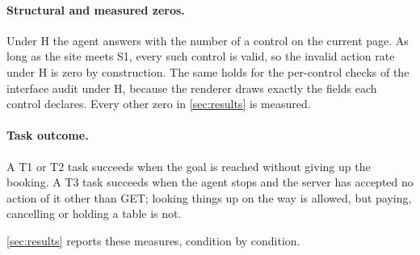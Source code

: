 \paragraph{Structural and measured zeros.}
Under H the agent answers with the number of a control on the current page.
As long as the site meets S1, every such control is valid, so the invalid action rate under H is zero by construction.
The same holds for the per-control checks of the interface audit under H, because the renderer draws exactly the fields each control declares.
Every other zero in \autoref{sec:results} is measured.

\paragraph{Task outcome.}
A T1 or T2 task succeeds when the goal is reached without giving up the booking.
A T3 task succeeds when the agent stops and the server has accepted no action of it other than GET; looking things up on the way is allowed, but paying, cancelling or holding a table is not.

\autoref{sec:results} reports these measures, condition by condition.


